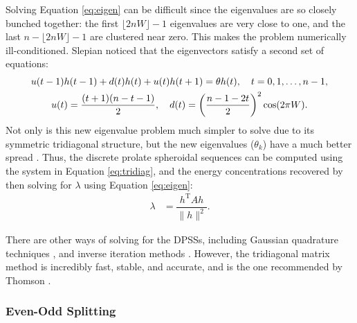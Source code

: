 Solving Equation \eqref{eq:eigen} can be difficult since the eigenvalues are so closely bunched together: the first $\lfloor 2nW \rfloor-1$ eigenvalues are very close to one, and the last $n-\lfloor 2nW \rfloor-1$ are clustered near zero.  This makes the problem numerically ill-conditioned.  Slepian \cite{slepian:seq} noticed that the eigenvectors satisfy a second set of equations:
\begin{align}
    \begin{gathered}
        u(t-1) h(t-1) + d(t) h(t) + u(t) h(t+1) = \theta h(t), \quad t=0,1,\ldots,n-1,\\
        u(t) = \dfrac{(t+1)(n-t-1)}{2}, \quad d(t)  = \left(\dfrac{n-1-2t}{2}\right)^2\cos(2\pi W).
    \end{gathered}\label{eq:tridiag}\index{discrete prolate spheroidal sequence (DPSS)!tridiagonal formulation}
\end{align}
Not only is this new eigenvalue problem much simpler to solve due to its symmetric tridiagonal structure, but the new eigenvalues ($\theta_k$) have a much better spread \cite{thomson:lecture}.  Thus, the discrete prolate spheroidal sequences can be computed using the system in Equation \ref{eq:tridiag}, and the energy concentrations recovered by then solving for $\lambda$ using Equation \ref{eq:eigen}:
\begin{align}
    \lambda & = \dfrac{h^\text{T}Ah}{\|h\|^2}. \label{eq:eigenvalue}
\end{align}


There are other ways of solving for the DPSSs, including Gaussian quadrature techniques \cite{thomson:multitaper}, and inverse iteration methods \cite{percival:multitaper}.  However, the tridiagonal matrix method is incredibly fast, stable, and accurate, and is the one recommended by Thomson \cite{thomson:lecture}.

\subsubsection{Even-Odd Splitting \label{sec:splitting}}

